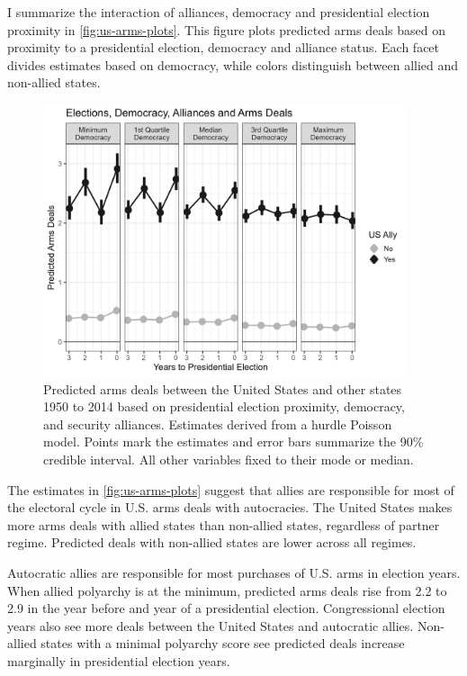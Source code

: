 \documentclass[12pt]{article}
\begin{document}
I summarize the interaction of alliances, democracy and presidential election proximity in \autoref{fig:us-arms-plots}.
This figure plots predicted arms deals based on proximity to a presidential election, democracy and alliance status. 
Each facet divides estimates based on democracy, while colors distinguish between allied and non-allied states. 


\begin{figure}[htpb]
	\centering
		\includegraphics[width=0.95\textwidth]{../figures/us-arms-plots.png}
	\caption{Predicted arms deals between the United States and other states 1950 to 2014 based on presidential election proximity, democracy, and security alliances. Estimates derived from a hurdle Poisson model. Points mark the estimates and error bars summarize the 90\% credible interval. All other variables fixed to their mode or median.}
	\label{fig:us-arms-plots}
\end{figure}


The estimates in \autoref{fig:us-arms-plots} suggest that allies are responsible for most of the electoral cycle in U.S. arms deals with autocracies. 
The United States makes more arms deals with allied states than non-allied states, regardless of partner regime. 
Predicted deals with non-allied states are lower across all regimes. 


Autocratic allies are responsible for most purchases of U.S. arms in election years. 
When allied polyarchy is at the minimum, predicted arms deals rise from 2.2 to 2.9 in the year before and year of a presidential election. 
Congressional election years also see more deals between the United States and autocratic allies. 
Non-allied states with a minimal polyarchy score see predicted deals increase marginally in presidential election years.
\end{document}
